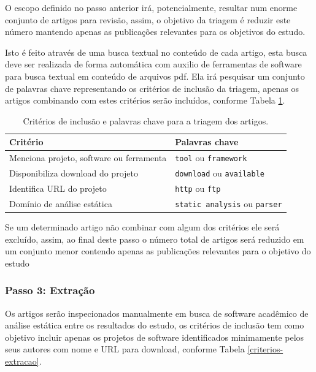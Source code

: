 O escopo definido no passo anterior irá, potencialmente, resultar num enorme
conjunto de artigos para revisão, assim, o objetivo da triagem é reduzir este
número mantendo apenas as publicações relevantes para os objetivos do estudo.

Isto é feito através de uma busca textual no conteúdo de cada artigo, esta
busca deve ser realizada de forma automática com auxilio de ferramentas de
software para busca textual em conteúdo de arquivos pdf. Ela irá pesquisar um
conjunto de palavras chave representando os critérios de inclusão da triagem,
apenas os artigos combinando com estes critérios serão incluídos, conforme
Tabela \ref{criterios-triagem}.

\begin{table}[h]
\caption{Critérios de inclusão e palavras chave para a triagem dos artigos.}
\centering
\begin{tabular}{ l l }
  \hline
  Critério                                 & Palavras chave                        \\
  \hline
  Menciona projeto, software ou ferramenta & {\tt tool} ou {\tt framework}         \\
  Disponibiliza download do projeto        & {\tt download} ou {\tt available}     \\
  Identifica URL do projeto                & {\tt http} ou {\tt ftp}               \\
  Domínio de análise estática              & {\tt static analysis} ou {\tt parser} \\
  \hline
\end{tabular}
\label{criterios-triagem}
\end{table}

Se um determinado artigo não combinar com algum dos critérios ele será
excluído, assim, ao final deste passo o número total de artigos será reduzido
em um conjunto menor contendo apenas as publicações relevantes para o objetivo
do estudo


\subsubsection{Passo 3: Extração}

Os artigos serão inspecionados manualmente em busca de software acadêmico de
análise estática entre os resultados do estudo, os critérios de inclusão tem
como objetivo incluir apenas os projetos de software identificados minimamente
pelos seus autores com nome e URL para download, conforme Tabela
\ref{criterios-extracao}.

